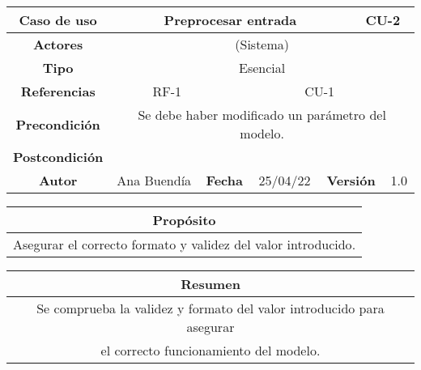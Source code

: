 \clearpage

\begin{table}[!h]
\begin{tabular}{|c|c|c|c|c|c|c|c|}
\hline
\rowcolor{cyan} \textbf{Caso de uso} & \multicolumn{5}{|c|}{Preprocesar entrada} & \multicolumn{2}{|c|}{CU-2} \\
\hline
\cellcolor{cyan} \textbf{Actores}              & \multicolumn{7}{|c|}{(Sistema)}           \\
\hline
\cellcolor{cyan} \textbf{Tipo}                 & \multicolumn{7}{|c|}{Esencial}             \\
\hline
\cellcolor{cyan} \textbf{Referencias}          & \multicolumn{2}{|c|}{RF-1}           & \multicolumn{5}{|c|}{CU-1}\\
\hline
\cellcolor{cyan} \textbf{Precondición}         & \multicolumn{7}{|c|}{Se debe haber modificado un parámetro del modelo.}             \\
\hline
\cellcolor{cyan} \textbf{Postcondición}        & \multicolumn{7}{|c|}{}              \\
\hline
\cellcolor{cyan} \textbf{Autor}                &   Ana Buendía   & \multicolumn{2}{|c|}{\cellcolor{cyan} \textbf{Fecha}} &  25/04/22   & \multicolumn{2}{|c|}{\cellcolor{cyan} \textbf{Versión}} & 1.0  \\
\hline
\end{tabular}
\end{table}

\begin{table}[!h]
\begin{tabular}{|c|}
\hline
\cellcolor{cyan} \textbf{Propósito} \\
\hline
Asegurar el correcto formato y validez del valor introducido. \\
\hline
\end{tabular}
\end{table}

\begin{table}[!h]
\begin{tabular}{|c|}
\hline
\cellcolor{cyan} \textbf{Resumen}  \\
\hline
 Se comprueba la validez y formato del valor introducido para asegurar \\ el correcto funcionamiento del modelo.  \\
\hline
\end{tabular}
\end{table}

